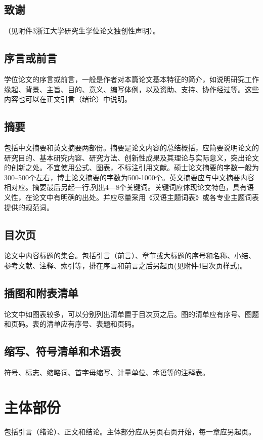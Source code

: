 \subsection{致谢} %
\label{sub:致谢}
（见附件3浙江大学研究生学位论文独创性声明）。
\subsection{序言或前言} %
\label{sub:序言或前言}
学位论文的序言或前言，一般是作者对本篇论文基本特征的简介，如说明研究工作缘起、背景、主旨、目的、意义、编写体例，以及资助、支持、协作经过等。这些内容也可以在正文引言（绪论）中说明。
\subsection{摘要} %
\label{sub:摘要}
包括中文摘要和英文摘要两部份。摘要是论文内容的总结概括，应简要说明论文的研究目的、基本研究内容、研究方法、创新性成果及其理论与实际意义，突出论文的创新之处。不宜使用公式、图表，不标注引用文献。硕士论文摘要的字数一般为300--500个左右，博士论文摘要的字数为500-1000个。英文摘要应与中文摘要内容相对应。摘要最后另起一行,列出4—8个关键词。关键词应体现论文特色，具有语义性，在论文中有明确的出处。并应尽量采用《汉语主题词表》或各专业主题词表提供的规范词。
\subsection{目次页} %
\label{sub:目次页}
论文中内容标题的集合。包括引言（前言）、章节或大标题的序号和名称、小结、参考文献、注释、索引等，排在序言和前言之后另起页(见附件4目次页样式)。
\subsection{插图和附表清单} %
\label{sub:插图和附表清单}
论文中如图表较多，可以分别列出清单置于目次页之后。图的清单应有序号、图题和页码。表的清单应有序号、表题和页码。
\subsection{缩写、符号清单和术语表} %
\label{sub:缩写_符号清单和术语表}
符号、标志、缩略词、首字母缩写、计量单位、术语等的注释表。
\section{主体部份} %
\label{sec:主体部份}
包括引言（绪论）、正文和结论。主体部分应从另页右页开始，每一章应另起页。
